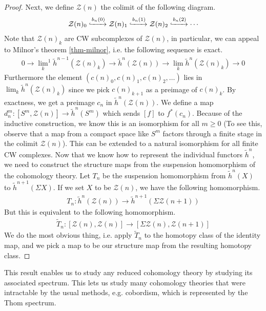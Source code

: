 \documentclass[12pt, notitlepage]{article}
\theoremstyle{definition}
\newcommand{\calz}{\mathcal{Z}}
\newcommand{\redco}{\widetilde{h}}
\begin{document}
\begin{proof}
  Next, we define $\calz(n)$ the colimit of the following diagram.
  \begin{align*}
    \calz(n)_0 \xhookrightarrow{b_n(0)} \calz(n)_1 \xhookrightarrow{b_n(1)} \calz(n)_2 \xhookrightarrow{b_n(2)} \cdots
  \end{align*}
  Note that $\calz(n)_k$ are CW subcomplexes of $\calz(n)$, in particular, we can appeal to Milnor's
  theorem \ref{thm-milnor}, i.e. the following sequence is exact.
  \begin{align*}
    0 \rightarrow {\lim_{k}}^1 \redco^{n-1} (\calz(n)_k) \rightarrow \redco^{n} (\calz(n)) \rightarrow \lim_{k} \redco^{n} (\calz(n)_k) \rightarrow 0
  \end{align*}
  Furthermore the element $(c(n)_0, c(n)_1, c(n)_2, \ldots)$ lies in
  $\lim_{k} \redco^{n} (\calz(n)_k)$ since we pick $c(n)_{k+1}$ as a preimage of $c(n)_k$. By
  exactness, we get a preimage $c_n$ in $\redco^{n} (\calz(n))$. We define a map
  $d_n^m: [S^m, \calz(n)] \to \redco^{n}(S^m)$ which sends $[f]$ to $f^{\ast}(c_n)$. Because of the
  inductive construction, we know this is an isomorphism for all $m \geq 0$ (To see this, observe
  that a map from a compact space like $S^m$ factors through a finite stage in the colimit
  $\calz(n)$). This can be extended to a natural isomorphism for all finite CW complexes.
  Now that we know how to represent the individual functors $\redco^{n}$, we need to construct the
  structure maps from the suspension homomorphism of the cohomology theory. Let $T_n$ be the
  suspension homomorphism from $\redco^n(X)$ to $\redco^{n+1}(\Sigma X)$. If we set $X$ to be
  $\calz(n)$, we have the following homomorphism.
  \begin{align*}
    T_n: \redco^n(\calz(n)) \to \redco^{n+1}(\Sigma \calz(n+1))
  \end{align*}
  But this is equivalent to the following homomorphism.
  \begin{align*}
    \widetilde{T}_n: [\calz(n), \calz(n)] \to [\Sigma \calz(n), \calz(n+1)]
  \end{align*}
  We do the most obvious thing, i.e. apply $\widetilde{T}_n$ to the homotopy class of the identity
  map, and we pick a map to be our structure map from the resulting homotopy class.

\end{proof}

This result enables us to study any reduced cohomology theory by studying its associated spectrum.
This lets us study many cohomology theories that were intractable by the usual methods, e.g.
cobordism, which is represented by the Thom spectrum.
\end{document}
